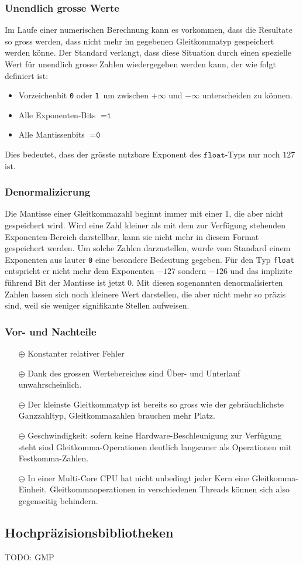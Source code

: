 \subsubsection{Unendlich grosse Werte}
Im Laufe einer numerischen Berechnung kann es vorkommen, dass die Resultate
so gross werden, dass nicht mehr im gegebenen Gleitkommatyp gespeichert
werden könne.
Der Standard verlangt, dass diese Situation durch einen spezielle Wert
für unendlich grosse Zahlen wiedergegeben werden kann, der wie
folgt definiert ist:
\begin{itemize}
\item Vorzeichenbit \texttt{0} oder \texttt{1} um zwischen
$+\infty$ und $-\infty$ unterscheiden zu können.
\item Alle Exponenten-Bits $= \texttt{1}$
\item Alle Mantissenbits $=\texttt{0}$
\end{itemize}
Dies bedeutet, dass der grösste nutzbare Exponent des $\texttt{float}$-Typs
nur noch $127$ ist.

\subsubsection{Denormalizierung}
%
Die Mantisse einer Gleitkommazahl beginnt immer mit einer 1, die aber
nicht gespeichert wird.
Wird eine Zahl kleiner als mit dem zur Verfügung stehenden Exponenten-Bereich
darstellbar, kann sie nicht mehr in diesem Format gespeichert werden.
Um solche Zahlen darzustellen, wurde vom Standard einem Exponenten aus
lauter \texttt{0} eine besondere Bedeutung gegeben.
Für den Typ \texttt{float} entspricht er nicht mehr dem Exponenten $-127$
sondern $-126$ und das implizite führend Bit der Mantisse ist jetzt 0.
Mit diesen sogenannten denormalisierten Zahlen lassen sich noch kleinere
Wert darstellen, die aber nicht mehr so präzis sind, weil sie weniger
signifikante Stellen aufweisen.

\subsubsection{Vor- und Nachteile}
\begin{itemize}
\item[$\oplus$] Konstanter relativer Fehler
\item[$\oplus$] Dank des grossen Wertebereiches sind Über- und Unterlauf
unwahrscheinlich.
\item[$\ominus$] Der kleinste Gleitkommatyp ist bereits so gross wie
der gebräuchlichste Ganzzahltyp,
Gleitkommazahlen brauchen mehr Platz.
\item[$\ominus$] Geschwindigkeit: sofern keine Hardware-Beschleunigung
zur Verfügung steht sind Gleitkomma-Operationen deutlich langsamer
als Operationen mit Festkomma-Zahlen.
\item[$\ominus$]
In einer Multi-Core CPU hat nicht unbedingt jeder Kern eine Gleitkomma-Einheit.
Gleitkommaoperationen in verschiedenen Threads können sich also gegenseitig
behindern.
\end{itemize}

\subsection{Hochpräzisionsbibliotheken
\label{buch:subsection:mp}}
TODO: GMP
